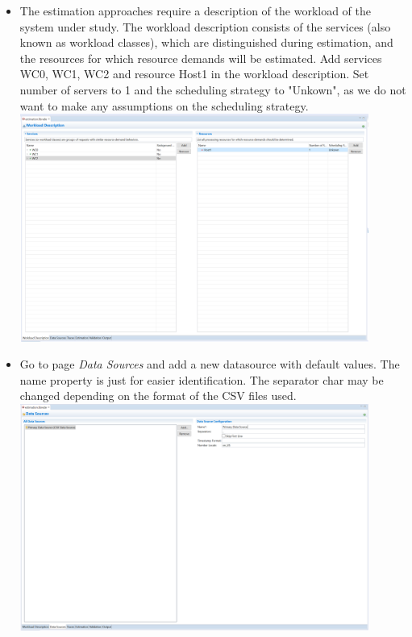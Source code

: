 \begin{itemize}
	\item The estimation approaches require a description of the workload of the system under study. The workload description consists of the services (also known as workload classes), which are distinguished during estimation, and the resources for which resource demands will be estimated. Add services WC0, WC1, WC2 and resource Host1 in the workload description. Set number of servers to 1 and the scheduling strategy to "Unkown", as we do not want to make any assumptions on the scheduling strategy.\newline
			\newline
			\includegraphics[width=0.9\textwidth]{screenshots/Screenshot13}
	\item Go to page \emph{Data Sources} and add a new datasource with default values. The name property is just for easier identification. The separator char may be changed depending on the format of the CSV files used. \newline
			\newline
			\includegraphics[width=0.9\textwidth]{screenshots/Screenshot14}			

\end{itemize}
